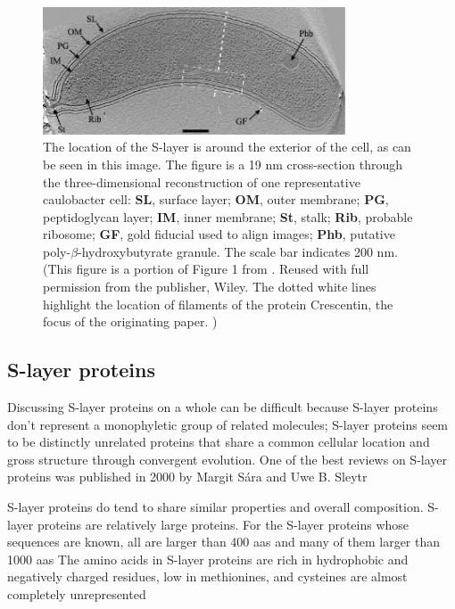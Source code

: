 \begin{figure}[htb]
  \begin{center}
    \includegraphics[width=0.8\textwidth]{intro/img/jensentomograph.jpg}
  \end{center}
  \caption[Electrotomograph of \ac{caulobacter}]{ The location of the \ac{S-layer} is around the
    exterior of the cell, as can be seen in this image. The figure is a 19 \si{\nano\meter}
    cross-section through the three-dimensional reconstruction of one representative
    \ac{caulobacter} cell: \textbf{SL}, surface layer;
    \textbf{OM}, outer membrane; \textbf{PG}, peptidoglycan layer; \textbf{IM}, inner membrane;
    \textbf{St}, stalk; \textbf{Rib}, probable ribosome; \textbf{GF}, gold fiducial used to align
    images; \textbf{Phb}, putative poly-$\beta$-hydroxybutyrate granule. The scale bar indicates 200 \si{\nano\meter}.  (This figure is a portion of Figure 1 from . Reused
    with full permission from the publisher, Wiley. The dotted white lines highlight the location of filaments of the protein Crescentin, the focus of the originating paper. )}
  \label{fig:intro-tomo}
\end{figure}

\subsection{S-layer proteins} \label{sub:intro-slayerproteins} %

Discussing \ac{S-layer} proteins on a whole can be difficult because \ac{S-layer} proteins don't represent a monophyletic group of related molecules; \ac{S-layer} proteins seem to be distinctly unrelated proteins that share a common cellular location and gross structure through convergent evolution. One of the best reviews on \ac{S-layer} proteins was published in 2000 by Margit S\'{a}ra and Uwe B. Sleytr 

\ac{S-layer} proteins do tend to share similar properties and overall composition. \ac{S-layer} proteins are relatively large proteins. For the \ac{S-layer} proteins whose sequences are known, all are larger than 400 \acp{aa} and many of them larger than 1000 \acp{aa} The amino acids in \ac{S-layer} proteins are rich in hydrophobic and negatively charged residues, low in methionines, and  cysteines are almost completely unrepresented  

